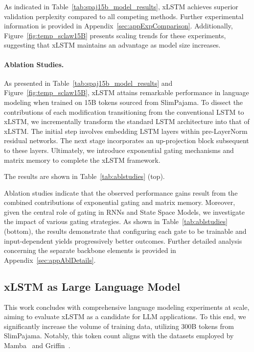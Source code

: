 As indicated in Table~\ref{tab:spaj15b_model_results}, xLSTM achieves superior validation perplexity compared to all competing methods. Further experimental information is provided in Appendix~\ref{sec:appExpComparison}. Additionally, Figure~\ref{fig:temp_sclaw15B} presents scaling trends for these experiments, suggesting that xLSTM maintains an advantage as model size increases.

\paragraph{Ablation Studies.}
As presented in Table~\ref{tab:spaj15b_model_results} and Figure~\ref{fig:temp_sclaw15B}, xLSTM attains remarkable performance in language modeling when trained on 15B tokens sourced from SlimPajama. To dissect the contributions of each modification transitioning from the conventional LSTM to xLSTM, we incrementally transform the standard LSTM architecture into that of xLSTM. The initial step involves embedding LSTM layers within pre-LayerNorm residual networks. The next stage incorporates an up-projection block subsequent to these layers. Ultimately, we introduce exponential gating mechanisms and matrix memory to complete the xLSTM framework.

The results are shown in Table~\ref{tab:ablstudies} (top). 

Ablation studies indicate that the observed performance gains result from the combined contributions of exponential gating and matrix memory. Moreover, given the central role of gating in RNNs and State Space Models, we investigate the impact of various gating strategies. As shown in Table~\ref{tab:ablstudies} (bottom), the results demonstrate that configuring each gate to be trainable and input-dependent yields progressively better outcomes. Further detailed analysis concerning the separate backbone elements is provided in Appendix~\ref{sec:appAblDetails}.

\subsection{xLSTM as Large Language Model}
\label{sec:ExpLanguage}

This work concludes with comprehensive language modeling experiments at scale, aiming to evaluate xLSTM as a candidate for LLM applications. To this end, we significantly increase the volume of training data, utilizing 300B tokens from SlimPajama. Notably, this token count aligns with the datasets employed by Mamba~\citep{Gu:24arxiv} and Griffin~\citep{De:24arxiv}.


